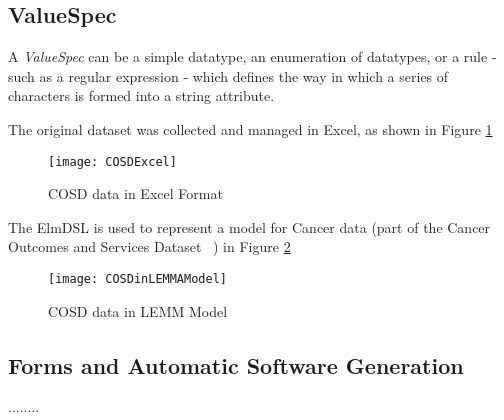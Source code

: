 \subsection{ValueSpec}
A \emph{ValueSpec} can be a simple datatype, an enumeration of datatypes, or a rule - such as a regular expression - which defines the way in which a series of characters is formed into a string attribute. 



The original dataset was collected and managed in Excel, as shown in Figure \ref{fig:excelCOSD}

\begin{figure}[here]
	\texttt{[image: COSDExcel]}
	\caption{COSD data in Excel Format} 
	\label{fig:excelCOSD}
\end{figure}
The ElmDSL is used to represent a model for Cancer data (part of the Cancer Outcomes and Services Dataset ~\cite{COSD}) in Figure \ref{fig:elmcosd}

\begin{figure}[here]
	\texttt{[image: COSDinLEMMAModel]}
	\caption{COSD data in LEMM Model} 
	\label{fig:elmcosd}
\end{figure}



\subsection{Forms and Automatic Software Generation}


........


